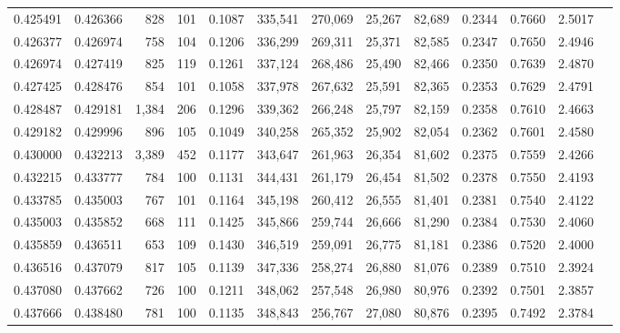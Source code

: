 \begin{tabular}{rrrrrrrrrrrrr}
0.425491 & 0.426366 &   828 & 101 &                                     0.1087 & 335,541 & 270,069 &  25,267 &  82,689 & 0.2344 & 0.7660 & 2.5017 \\
0.426377 & 0.426974 &   758 & 104 &                                     0.1206 & 336,299 & 269,311 &  25,371 &  82,585 & 0.2347 & 0.7650 & 2.4946 \\
0.426974 & 0.427419 &   825 & 119 &                                     0.1261 & 337,124 & 268,486 &  25,490 &  82,466 & 0.2350 & 0.7639 & 2.4870 \\
0.427425 & 0.428476 &   854 & 101 &                                     0.1058 & 337,978 & 267,632 &  25,591 &  82,365 & 0.2353 & 0.7629 & 2.4791 \\
0.428487 & 0.429181 & 1,384 & 206 &                                     0.1296 & 339,362 & 266,248 &  25,797 &  82,159 & 0.2358 & 0.7610 & 2.4663 \\
0.429182 & 0.429996 &   896 & 105 &                                     0.1049 & 340,258 & 265,352 &  25,902 &  82,054 & 0.2362 & 0.7601 & 2.4580 \\
0.430000 & 0.432213 & 3,389 & 452 &                                     0.1177 & 343,647 & 261,963 &  26,354 &  81,602 & 0.2375 & 0.7559 & 2.4266 \\
0.432215 & 0.433777 &   784 & 100 &                                     0.1131 & 344,431 & 261,179 &  26,454 &  81,502 & 0.2378 & 0.7550 & 2.4193 \\
0.433785 & 0.435003 &   767 & 101 &                                     0.1164 & 345,198 & 260,412 &  26,555 &  81,401 & 0.2381 & 0.7540 & 2.4122 \\
0.435003 & 0.435852 &   668 & 111 &                                     0.1425 & 345,866 & 259,744 &  26,666 &  81,290 & 0.2384 & 0.7530 & 2.4060 \\
0.435859 & 0.436511 &   653 & 109 &                                     0.1430 & 346,519 & 259,091 &  26,775 &  81,181 & 0.2386 & 0.7520 & 2.4000 \\
0.436516 & 0.437079 &   817 & 105 &                                     0.1139 & 347,336 & 258,274 &  26,880 &  81,076 & 0.2389 & 0.7510 & 2.3924 \\
0.437080 & 0.437662 &   726 & 100 &                                     0.1211 & 348,062 & 257,548 &  26,980 &  80,976 & 0.2392 & 0.7501 & 2.3857 \\
0.437666 & 0.438480 &   781 & 100 &                                     0.1135 & 348,843 & 256,767 &  27,080 &  80,876 & 0.2395 & 0.7492 & 2.3784 \\

\end{tabular}
